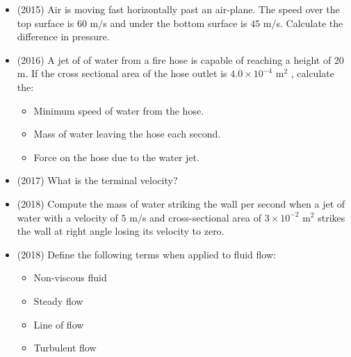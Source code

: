 \documentclass{article}
\begin{document}
\begin{itemize}
\item (2015)  Air is moving fast horizontally past an air-plane.  The speed over the top surface is $ 60$ m$/$s and under the bottom surface is $ 45$ m$/$s.  Calculate the difference in pressure.
\item (2016)   A jet of of water from a fire hose is capable of reaching a height of $ 20$ m.  If the cross sectional area of the hose outlet is $ 4.0	\times 10^{-4}$ m$ ^{2}$ , calculate the:
 \begin{itemize}
\item Minimum speed of water from the hose.
\item Mass of water leaving the hose each second.
\item Force on the hose due to the water jet.
\end{itemize}
\item (2017)  What is the terminal velocity?
\item (2018)  Compute the mass of water striking the wall per second when a jet of water with a velocity of $ 5$ m$/$s and cross-sectional area of $ 3 \times 10^{-2}$ m$ ^{2}$ strikes the wall at right angle losing its velocity to zero. 
\item (2018)  Define the following terms when applied to fluid flow:
 \begin{itemize}
\item Non-viscous fluid 
\item Steady flow 
\item Line of flow 
\item Turbulent flow
\end{itemize}
\end{itemize}
\end{document}
